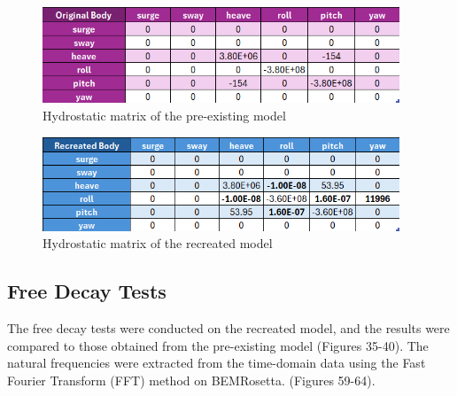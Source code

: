 \documentclass[a4paper, 11pt]{article}
\begin{document}
\begin{figure}[H]
    \centering
    \includegraphics[width=0.95\textwidth]{hyd_st_org.png}
    \caption{\small Hydrostatic matrix of the pre-existing model}
    \label{fig:hyd_st_org}
\end{figure}

\begin{figure}[H]
    \centering
    \includegraphics[width=0.95\textwidth]{hyd_st_re.png}
    \caption{\small Hydrostatic matrix of the recreated model}
    \label{fig:hyd_st_re}
\end{figure}

\subsection{Free Decay Tests}
\hspace*{0.5cm}The free decay tests were conducted on the recreated model, and the results were compared to those obtained from the pre-existing model (Figures 35-40). The natural frequencies were extracted from the time-domain data using the Fast Fourier Transform (FFT) method on BEMRosetta. (Figures 59-64). 
\end{document}
